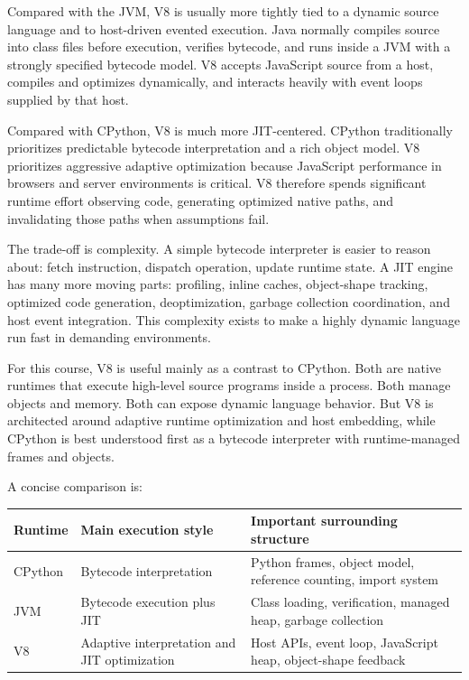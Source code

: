 Compared with the JVM, V8 is usually more tightly tied to a dynamic source language and to host-driven evented execution. Java normally compiles source into class files before execution, verifies bytecode, and runs inside a JVM with a strongly specified bytecode model. V8 accepts JavaScript source from a host, compiles and optimizes dynamically, and interacts heavily with event loops supplied by that host.

Compared with CPython, V8 is much more JIT-centered. CPython traditionally prioritizes predictable bytecode interpretation and a rich object model. V8 prioritizes aggressive adaptive optimization because JavaScript performance in browsers and server environments is critical. V8 therefore spends significant runtime effort observing code, generating optimized native paths, and invalidating those paths when assumptions fail.

The trade-off is complexity. A simple bytecode interpreter is easier to reason about: fetch instruction, dispatch operation, update runtime state. A JIT engine has many more moving parts: profiling, inline caches, object-shape tracking, optimized code generation, deoptimization, garbage collection coordination, and host event integration. This complexity exists to make a highly dynamic language run fast in demanding environments.

For this course, V8 is useful mainly as a contrast to CPython. Both are native runtimes that execute high-level source programs inside a process. Both manage objects and memory. Both can expose dynamic language behavior. But V8 is architected around adaptive runtime optimization and host embedding, while CPython is best understood first as a bytecode interpreter with runtime-managed frames and objects.

A concise comparison is:

\begin{center}
\begin{tabular}{|p{}|p{}|p{}|}
\hline
\textbf{Runtime} & \textbf{Main execution style} & \textbf{Important surrounding structure} \\
\hline
CPython & Bytecode interpretation & Python frames, object model, reference counting, import system \\
\hline
JVM & Bytecode execution plus JIT & Class loading, verification, managed heap, garbage collection \\
\hline
V8 & Adaptive interpretation and JIT optimization & Host APIs, event loop, JavaScript heap, object-shape feedback \\
\hline
\end{tabular}
\end{center}


